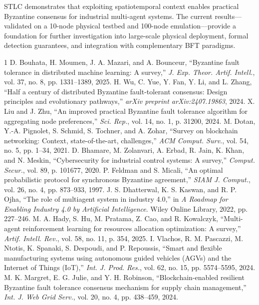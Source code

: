 \documentclass[manuscript,screen,review]{acmart}
\begin{document}
STLC demonstrates that exploiting spatiotemporal context enables practical Byzantine consensus for industrial multi-agent systems. The current results---validated on a 10-node physical testbed and 100-node emulation---provide a foundation for further investigation into large-scale physical deployment, formal detection guarantees, and integration with complementary BFT paradigms.

\begin{thebibliography}{1}
D. Bouhata, H. Moumen, J. A. Mazari, and A. Bounceur, ``Byzantine fault tolerance in distributed machine learning: A survey,'' \textit{J. Exp. Theor. Artif. Intell.}, vol. 37, no. 8, pp. 1331--1389, 2025.
H. Wu, C. Yue, Y. Fan, Y. Li, and L. Zhang, ``Half a century of distributed Byzantine fault-tolerant consensus: Design principles and evolutionary pathways,'' \textit{arXiv preprint arXiv:2407.19863}, 2024.
X. Liu and J. Zhu, ``An improved practical Byzantine fault tolerance algorithm for aggregating node preferences,'' \textit{Sci. Rep.}, vol. 14, no. 1, p. 31200, 2024.
M. Dotan, Y.-A. Pignolet, S. Schmid, S. Tochner, and A. Zohar, ``Survey on blockchain networking: Context, state-of-the-art, challenges,'' \textit{ACM Comput. Surv.}, vol. 54, no. 5, pp. 1--34, 2021.
D. Bhamare, M. Zolanvari, A. Erbad, R. Jain, K. Khan, and N. Meskin, ``Cybersecurity for industrial control systems: A survey,'' \textit{Comput. Secur.}, vol. 89, p. 101677, 2020.
P. Feldman and S. Micali, ``An optimal probabilistic protocol for synchronous Byzantine agreement,'' \textit{SIAM J. Comput.}, vol. 26, no. 4, pp. 873--933, 1997.
J. S. Dhatterwal, K. S. Kaswan, and R. P. Ojha, ``The role of multiagent system in industry 4.0,'' in \textit{A Roadmap for Enabling Industry 4.0 by Artificial Intelligence}. Wiley Online Library, 2022, pp. 227--246.
M. A. Hady, S. Hu, M. Pratama, Z. Cao, and R. Kowalczyk, ``Multi-agent reinforcement learning for resources allocation optimization: A survey,'' \textit{Artif. Intell. Rev.}, vol. 58, no. 11, p. 354, 2025.
I. Vlachos, R. M. Pascazzi, M. Ntotis, K. Spanaki, S. Despoudi, and P. Repoussis, ``Smart and flexible manufacturing systems using autonomous guided vehicles (AGVs) and the Internet of Things (IoT),'' \textit{Int. J. Prod. Res.}, vol. 62, no. 15, pp. 5574--5595, 2024.
M. K. Margret, E. G. Julie, and Y. H. Robinson, ``Blockchain-enabled resilient Byzantine fault tolerance consensus mechanism for supply chain management,'' \textit{Int. J. Web Grid Serv.}, vol. 20, no. 4, pp. 438--459, 2024.

\end{thebibliography}
\end{document}
